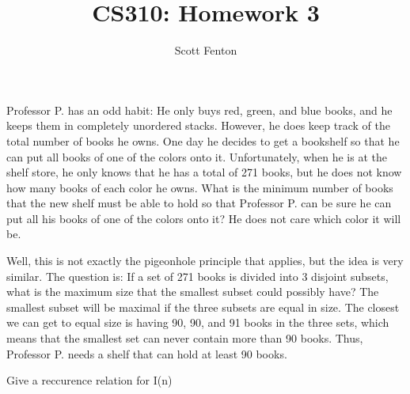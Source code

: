 \documentclass[10pt]{article}
\newenvironment{exercise}[2][Exercise]{\begin{trivlist}
\item[\hskip \labelsep {\bfseries #1}\hskip \labelsep {\bfseries #2.}]}{\end{trivlist}}
\newenvironment{solution}[2][Solution]{\begin{trivlist}
\item[\hskip \labelsep {\bfseries #1}\hskip \labelsep {\bfseries #2.}]}{\end{trivlist}}
\theoremstyle{definition}
\begin{document}
 
 
 
\title{CS310: Homework 3}%
\author{Scott Fenton\\ %
} %
 
\maketitle
 
\begin{exercise}{(1)} %
Professor P. has an odd habit: He only buys red, green, and blue books, and he keeps them in completely unordered stacks. However, he does keep track of the total number of books he owns. One day he decides to get a bookshelf so that he can put all books of one of the colors onto it. Unfortunately, when he is at the shelf store, he only knows that he has a total of 271 books, but he does not know how many books of each color he owns. What is the minimum number of books that the new shelf must be able to hold so that Professor P. can be sure he can put all his books of one of the colors onto it? He does not care which color it will be.
\end{exercise}
 
\begin{solution}{(1)}
Well, this is not exactly the pigeonhole principle that applies, but the idea is very similar. The question is: If a set of 271 books is divided into 3 disjoint subsets, what is the maximum size that the smallest subset could possibly have? The smallest subset will be maximal if the three subsets are equal in size. The closest we can get to equal size is having 90, 90, and 91 books in the three sets, which means that the smallest set can never contain more than 90 books. Thus, Professor P. needs a shelf that can hold at least 90 books.
\end{solution}

\begin{exercise}{(1b)} %
Give a reccurence relation for I(n)
\end{exercise}
\end{document}
